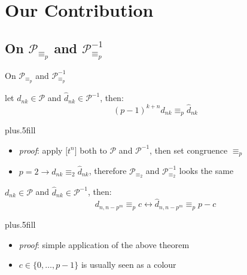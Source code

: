 \documentclass[10pt,serif, professionalfont]{beamer}
\begin{document}
\section{Our Contribution}

\subsection{On $\mathcal{P}_{\equiv_{p}}$ and $\mathcal{P}_{\equiv_{p}}^{-1}$}

\begin{frame}{On $\mathcal{P}_{\equiv_{p}}$ and $\mathcal{P}_{\equiv_{p}}^{-1}$}
    \begin{theorem}
        let $d_{nk}\in\mathcal{P}$ and  $\hat{d}_{nk}\in\mathcal{P}^{-1}$, then:
            \begin{displaymath}
                (p-1)^{k+n}d_{nk}\equiv_{p} \hat{d}_{nk}
            \end{displaymath}
    \end{theorem}
      \vskip-20pt plus.5fill
    \begin{itemize}
        \item \emph{proof}: apply $\big[t^{n}\big]$ both to $\mathcal{P}$ and $\mathcal{P}^{-1}$,
            then set congruence $\equiv_{p}$ 
        \item $p=2 \rightarrow d_{nk}\equiv_{2}\hat{d}_{nk}$, therefore $\mathcal{P}_{\equiv_{2}}$ and 
            $\mathcal{P}_{\equiv_{2}}^{-1}$ looks the same
    \end{itemize}
    \pause
    \begin{theorem}
        $d_{nk}\in\mathcal{P}$ and $\hat{d}_{nk}\in\mathcal{P}^{-1}$, then:
            \begin{displaymath}
                d_{n,n-p^{m}} \equiv_{p} c \leftrightarrow \hat{d}_{n,n-p^{m}} \equiv_{p} p-c
            \end{displaymath}
    \end{theorem}
      \vskip-20pt plus.5fill
    \begin{itemize}
        \item \emph{proof}: simple application of the above theorem
        \item $c\in\lbrace0,\ldots,p-1\rbrace$ is usually seen as a colour
    \end{itemize}
\end{frame}
\end{document}

